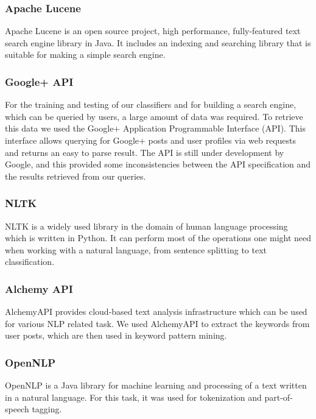 \subsubsection*{Apache Lucene}
Apache Lucene is an open source project, high performance, fully-featured text search engine library in Java. It includes an indexing and searching library that is suitable for making  a simple search engine.
\subsubsection*{Google+ API}
For the training and testing of our classifiers and for building a search engine, which can be queried by users, a large amount of data was required. To retrieve this data we used the Google+ Application Programmable Interface (API). This interface allows querying for Google+ posts and user profiles via web requests and returns an easy to parse result. The API is still under development by Google, and this provided some inconsistencies between the API specification and the results retrieved from our queries.
\subsubsection*{NLTK}
NLTK is a widely used library in the domain of human language processing which is written in Python. It can perform most of the operations one might need when working with a natural language, from sentence splitting to text classification. 
\subsubsection*{Alchemy API}
AlchemyAPI provides cloud-based text analysis infrastructure which can be used for various NLP related task. We used AlchemyAPI to extract the keywords from user posts, which are then used in keyword pattern mining. 
\subsubsection*{OpenNLP}
OpenNLP is a Java library for machine learning and processing of a text written in a natural language. For this task, it was used for tokenization and part-of-speech tagging.